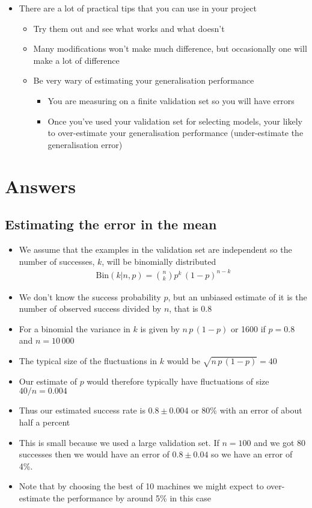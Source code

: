\documentclass[11pt]{article}
\begin{document}
\begin{itemize}
\item There are a lot of practical tips that you can use in your project
\begin{itemize}
\item Try them out and see what works and what doesn't
\item Many modifications won't make much difference, but occasionally one
will make a lot of difference
\item Be very wary of estimating your generalisation performance
\begin{itemize}
\item You are measuring on a finite validation set so you will have errors
\item Once you've used your validation set for selecting models,
your likely to over-estimate your generalisation performance
(under-estimate the generalisation error)
\end{itemize}
\end{itemize}
\end{itemize}


\section{Answers}
\label{sec:org544f6fd}

\subsection{Estimating the error in the mean}
\label{sec:org461deb2}

\begin{itemize}
\item We assume that the examples in the validation set are independent so
the number of successes, \(k\), will be binomially distributed
\begin{align*}
 \mathrm{Bin}(k|n,p) = \binom{n}{k} p^k\,(1-p)^{n-k}
\end{align*}
\item We don't know the success probability \(p\), but an unbiased estimate of
it is the number of observed success divided by \(n\), that is \(0.8\)
\item For a binomial the variance in \(k\) is given by \(n\,p\,(1-p)\) or 1600 
if \(p=0.8\) and \(n=10\,000\)
\item The typical size of the fluctuations in \(k\) would be \(\sqrt{n\,p\,(1-p)}=40\)
\item Our estimate of \(p\) would therefore typically have fluctuations
of size \(40/n =0.004\)
\item Thus our estimated success rate is \(0.8\pm0.004\) or 80\% with an error 
of about half a percent
\item This is small because we used a large validation set.  If \(n=100\) and
we got 80 successes then we would have an error of \(0.8\pm0.04\) so we have
an error of 4\%.
\item Note that by choosing the best of 10 machines we might expect to 
over-estimate the performance by around 5\% in this case
\end{itemize}
\end{document}
